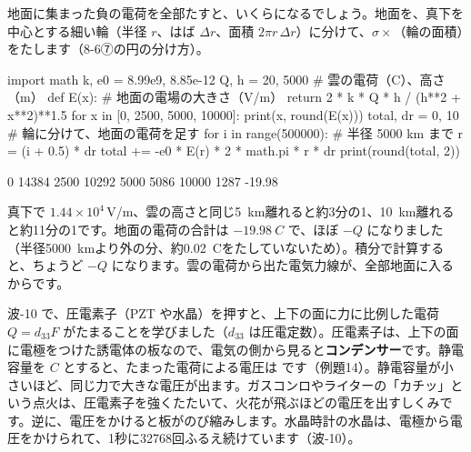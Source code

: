 地面に集まった負の電荷を全部たすと、いくらになるでしょう。地面を、真下を中心とする細い輪（半径 $r$、はば $\Delta r$、面積 $2\pi r\,\Delta r$）に分けて、$\sigma\times$（輪の面積）をたします（8-6⑦の円の分け方）。
\begin{phcode}[Python]
import math
k, e0 = 8.99e9, 8.85e-12
Q, h = 20, 5000                 \# 雲の電荷（C）、高さ（m）
def E(x):                       \# 地面の電場の大きさ（V/m）
    return 2 * k * Q * h / (h**2 + x**2)**1.5
for x in [0, 2500, 5000, 10000]:
    print(x, round(E(x)))
total, dr = 0, 10               \# 輪に分けて、地面の電荷を足す
for i in range(500000):         \# 半径 5000 km まで
    r = (i + 0.5) * dr
    total += -e0 * E(r) * 2 * math.pi * r * dr
print(round(total, 2))
\end{phcode}
\begin{phcodeout}
0 14384
2500 10292
5000 5086
10000 1287
-19.98
\end{phcodeout}
真下で $1.44\times10^4$\,V/m、雲の高さと同じ\qty{5}{km}離れると約3分の1、\qty{10}{km}離れると約11分の1です。地面の電荷の合計は $\qty{-19.98}{C}$ で、ほぼ $-Q$ になりました（半径\qty{5000}{km}より外の分、約\qty{0.02}{C}をたしていないため）。積分で計算すると、ちょうど $-Q$ になります。雲の電荷から出た電気力線が、全部地面に入るからです。

\begin{phmodel}[雷雲と地面]
\end{phmodel}

\label{ph:電-3:sec13}
波-10 で、圧電素子（PZT や水晶）を押すと、上下の面に力に比例した電荷 $Q=d_{33}F$ がたまることを学びました（$d_{33}$ は圧電定数）。圧電素子は、上下の面に電極をつけた誘電体の板なので、電気の側から見ると\textbf{コンデンサー}です。静電容量を $C$ とすると、たまった電荷による電圧は
です（例題14）。静電容量が小さいほど、同じ力で大きな電圧が出ます。ガスコンロやライターの「カチッ」という点火は、圧電素子を強くたたいて、火花が飛ぶほどの電圧を出すしくみです。逆に、電圧をかけると板がのび縮みします。水晶時計の水晶は、電極から電圧をかけられて、1秒に\num{32768}回ふるえ続けています（波-10）。

